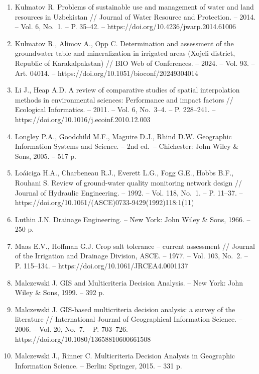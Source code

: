 \documentclass[14pt,a4paper,oneside]{extreport}
\begin{document}
\begin{enumerate}
  problems on the Witwatersrand // Journal of the Chemical,
  Metallurgical and Mining Society of South Africa. -- 1951. -- Vol. 52,
  No.~6. -- P. 119--139.
\item
  Kulmatov R. Problems of sustainable use and management of water and
  land resources in Uzbekistan // Journal of Water Resource and
  Protection. -- 2014. -- Vol. 6, No.~1. -- P. 35--42. --
  https://doi.org/10.4236/jwarp.2014.61006
\item
  Kulmatov R., Alimov A., Opp C. Determination and assessment of the
  groundwater table and mineralization in irrigated areas (Xojeli
  district, Republic of Karakalpakstan) // BIO Web of Conferences. --
  2024. -- Vol. 93. -- Art. 04014. --
  https://doi.org/10.1051/bioconf/20249304014
\item
  Li J., Heap A.D. A review of comparative studies of spatial
  interpolation methods in environmental sciences: Performance and
  impact factors // Ecological Informatics. -- 2011. -- Vol. 6,
  No.~3--4. -- P. 228--241. --
  https://doi.org/10.1016/j.ecoinf.2010.12.003
\item
  Longley P.A., Goodchild M.F., Maguire D.J., Rhind D.W. Geographic
  Information Systems and Science. -- 2nd ed.~-- Chichester: John Wiley
  \& Sons, 2005. -- 517 p.
\item
  Loáiciga H.A., Charbeneau R.J., Everett L.G., Fogg G.E., Hobbs B.F.,
  Rouhani S. Review of ground-water quality monitoring network design //
  Journal of Hydraulic Engineering. -- 1992. -- Vol. 118, No.~1. -- P.
  11--37. -- https://doi.org/10.1061/(ASCE)0733-9429(1992)118:1(11)
\item
  Luthin J.N. Drainage Engineering. -- New York: John Wiley \& Sons,
  1966. -- 250 p.
\item
  Maas E.V., Hoffman G.J. Crop salt tolerance -- current assessment //
  Journal of the Irrigation and Drainage Division, ASCE. -- 1977. --
  Vol. 103, No.~2. -- P. 115--134. --
  https://doi.org/10.1061/JRCEA4.0001137
\item
  Malczewski J. GIS and Multicriteria Decision Analysis. -- New York:
  John Wiley \& Sons, 1999. -- 392 p.
\item
  Malczewski J. GIS-based multicriteria decision analysis: a survey of
  the literature // International Journal of Geographical Information
  Science. -- 2006. -- Vol. 20, No.~7. -- P. 703--726. --
  https://doi.org/10.1080/13658810600661508
\item
  Malczewski J., Rinner C. Multicriteria Decision Analysis in Geographic
  Information Science. -- Berlin: Springer, 2015. -- 331 p.

\end{enumerate}
\end{document}
